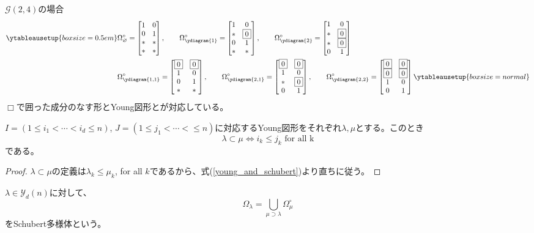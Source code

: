 \documentclass{ltjsreport}
\begin{document}
\begin{eg}
  $\mathcal{G}(2,4)$の場合
\begin{align*}
  \ytableausetup{boxsize=0.5em}
  &\Omega^\circ_{\varnothing}=\bmat{
    1 & 0\\
    0 & 1\\
    * & *\\
    * & *
  },\qquad 
  \Omega^\circ_{\ydiagram{1}}=\bmat{
    1 & 0\\
    * & \fbox{0}\\
    0 & 1\\
    * & *
  },\qquad
  \Omega^\circ_{\ydiagram{2}}=\bmat{
    1 & 0\\
    * & \fbox{0}\\
    * & \fbox{0}\\
    0 & 1
  }\\
  &\Omega^\circ_{\ydiagram{1,1}}=\bmat{
    \fbox{0} & \fbox{0}\\
    1 & 0\\
    0 & 1\\
    * & *
  },\qquad
  \Omega^\circ_{\ydiagram{2,1}}=\bmat{
    \fbox{0} & \fbox{0}\\
    1 & 0\\
    * & \fbox{0}\\
    0 & 1
  },\qquad
  \Omega^\circ_{\ydiagram{2,2}}=\bmat{
    \fbox{0} & \fbox{0}\\
    \fbox{0} & \fbox{0}\\
    1 & 0\\
    0 & 1
  }
  \ytableausetup{boxsize=normal}
\end{align*}
$\Box$で囲った成分のなす形とYoung図形とが対応している。
\end{eg}

\begin{prop}
  $I=(1\leq i_1<\cdots<i_d\leq n)$, $J=(1\leq j_1<\cdots<\leq n)$に対応するYoung図形をそれぞれ$\lambda,\mu$とする。このとき
  \[
  \lambda\subset\mu\Leftrightarrow i_k\leq j_k\text{ for all k}  
  \]
  である。
\end{prop}

\begin{proof}
  $\lambda\subset\mu$の定義は$\lambda_k\leq\mu_k$, for all $k$であるから、式(\ref{young_and_schubert})より直ちに従う。
\end{proof}



\begin{defin}[標準的な旗に付随するShubert多様体]
  $\lambda\in\mathcal{Y}_d(n)$に対して、
  \[
  \Omega_\lambda=\bigcup_{\mu\supset\lambda}\Omega^\circ_\mu
  \]
  をSchubert多様体という。
\end{defin}
\end{document}

